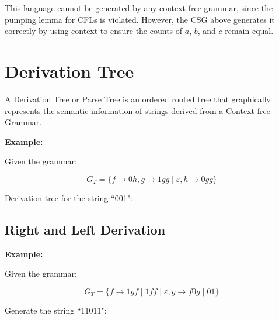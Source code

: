 \documentclass[12pt,a4paper,openany]{article}
\begin{document}
\noindent This language cannot be generated by any context-free grammar, since the pumping lemma for CFLs is violated. However, the CSG above generates it correctly by using context to ensure the counts of $a$, $b$, and $c$ remain equal.

\section{Derivation Tree}

A Derivation Tree or Parse Tree is an ordered rooted tree that graphically represents
the semantic information of strings derived from a Context-free Grammar. 

\textbf{Example:}

Given the grammar:

\[G_T = \{f \to 0h, g \to 1gg \mid \varepsilon, h \to 0gg\}\]

Derivation tree for the string ``001":

\begin{center}
\end{center}

\subsection{Right and Left Derivation}

\textbf{Example:}

Given the grammar:

\[G_T = \{f \to 1gf \mid 1ff \mid \varepsilon , g \to f0g \mid 01\}\]

Generate the string ``11011":
\end{document}
